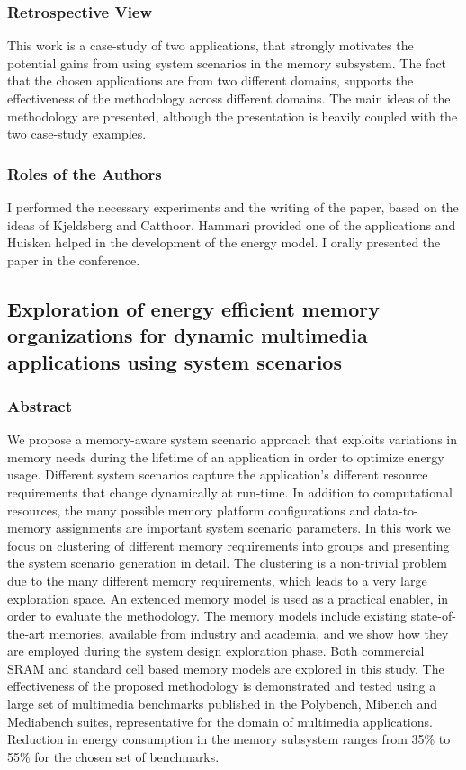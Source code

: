 \subsubsection{Retrospective View}

This work is a case-study of two applications, that strongly motivates the potential gains from using system scenarios in the memory subsystem.
The fact that the chosen applications are from two different domains, supports the effectiveness of the methodology across different domains.
The main ideas of the methodology are presented, although the presentation is heavily coupled with the two case-study examples.

\subsubsection{Roles of the Authors}

I performed the necessary experiments and the writing of the paper, based on the ideas of Kjeldsberg and Catthoor. 
Hammari provided one of the applications and Huisken helped in the development of the energy model.
I orally presented the paper in the conference.

\subsection{Exploration of energy efficient memory organizations for dynamic multimedia applications using system scenarios}

\subsubsection{Abstract}

We propose a memory-aware system scenario approach that exploits variations in memory needs during the lifetime of an application in order to optimize energy usage. 
Different system scenarios capture the application's different resource requirements that change dynamically at run-time. 
In addition to computational resources, the many possible memory platform configurations and data-to-memory assignments are important system scenario parameters. 
In this work we focus on clustering of different memory requirements into groups and presenting the system scenario generation in detail.
The clustering is a non-trivial problem due to the many different memory requirements, which leads to a very large exploration space.
An extended memory model is used as a practical enabler, in order to evaluate the methodology. 
The memory models include existing state-of-the-art memories, available from industry and academia, and we show how they are employed during the system design exploration phase. 
Both commercial SRAM and standard cell based memory models are explored in this study. 
The effectiveness of the proposed methodology is demonstrated and tested using a large set of multimedia benchmarks published in the Polybench, Mibench and Mediabench suites,
representative for the domain of multimedia applications.
Reduction in energy consumption in the memory subsystem ranges from 35\% to 55\% for the chosen set of benchmarks.

